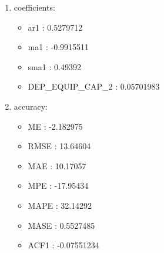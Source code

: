 \documentclass[10pt,a4paper]{article}\usepackage[]{graphicx}\usepackage[]{color}
\newcommand{\AaA}{\_}
\begin{document}
\begin{multicols}{2}
\begin{enumerate}
\item coefficients:
\begin{itemize}
\item  ar1 :  0.5279712 
\item  ma1 :  -0.9915511 
\item  sma1 :  0.49392 
\item  DEP\AaA EQUIP\AaA CAP\AaA 2 :  0.05701983 
\end{itemize}
\item accuracy:
\begin{itemize}
\item  ME :  -2.182975 
\item  RMSE :  13.64604 
\item  MAE :  10.17057 
\item  MPE :  -17.95434 
\item  MAPE :  32.14292 
\item  MASE :  0.5527485 
\item  ACF1 :  -0.07551234 
\end{itemize}
\end{enumerate}
\end{multicols}
\end{document}
